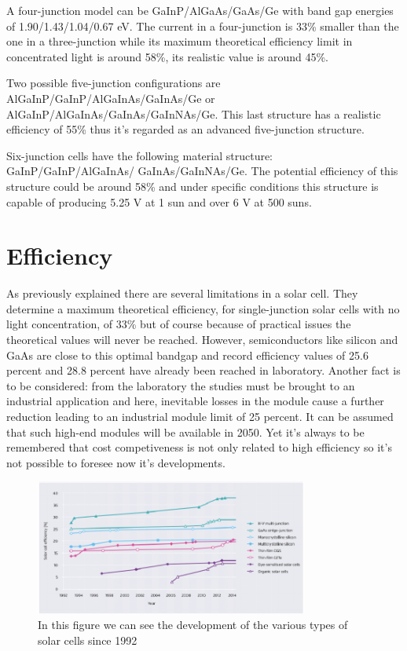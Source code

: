 \documentclass[11pt]{article} %
\begin{document}
A four-junction model can be GaInP/AlGaAs/GaAs/Ge with band gap energies of 1.90/1.43/1.04/0.67 eV. The current in a four-junction is 33\% smaller than the one in a three-junction while its maximum theoretical efficiency limit in concentrated light is around 58\%, its realistic value is around 45\%.  

Two possible five-junction configurations are AlGaInP/GaInP/AlGaInAs/GaInAs/Ge or AlGaInP/AlGaInAs/GaInAs/GaInNAs/Ge. This last structure has a realistic efficiency  of 55\% thus it's regarded as an advanced five-junction structure. 

Six-junction cells have the following material structure: GaInP/GaInP/AlGaInAs/ GaInAs/GaInNAs/Ge. The potential efficiency of this structure could be around 58\% and under specific conditions this structure is capable of producing 5.25 V at 1 sun and over 6 V at 500 suns.

\section{Efficiency}
As previously explained there are several limitations in a solar cell. They determine a maximum theoretical efficiency, for single-junction solar cells with no light concentration, of 33\% but of course because of practical issues the theoretical values will never be reached. However, semiconductors like silicon and GaAs are close to this optimal bandgap and record efficiency values of 25.6 percent and 28.8 percent have already been reached in laboratory. Another fact is to be considered: from the laboratory the studies must be brought to an industrial application and here, inevitable losses in the module cause a further reduction leading to an industrial module limit of 25 percent. It can be assumed that such high-end modules will be available in 2050. Yet it’s always to be remembered that cost competiveness is not only related to high efficiency so it’s not possible to foresee now it’s developments. 

\begin{figure}[h]
	\centering
	\includegraphics[width=0.8\textwidth]{img/Immagine.png}
	\caption{In this figure we can see the development of the various types of solar cells since 1992}
\end{figure}
\end{document}
